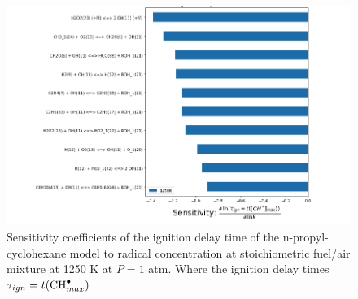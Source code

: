 \begin{figure}
    \centering
    \includegraphics[scale=0.45, keepaspectratio]{images/pch-sensitivity.png}
    \caption{Sensitivity coefficients of the ignition delay time of the n-propyl-cyclohexane model to  radical concentration at stoichiometric fuel/air mixture at 1250 K at $P=1$ atm. Where the ignition delay times $\tau_{ign}=t(\ce{CH^.}_{max})$}
    \label{fig:pch-sensitivity}
\end{figure}

